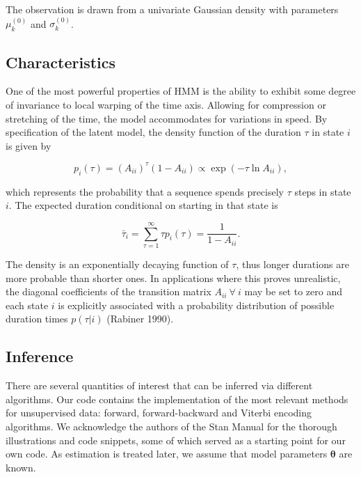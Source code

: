 \documentclass[]{article}
\newcommand{\mat}[1]{\mathbf{#1}}
\begin{document}
The observation is drawn from a univariate Gaussian density with
parameters \(\mu_k^{(0)}\) and \(\sigma_k^{(0)}\).

\subsection{Characteristics}\label{characteristics}

One of the most powerful properties of HMM is the ability to exhibit
some degree of invariance to local warping of the time axis. Allowing
for compression or stretching of the time, the model accommodates for
variations in speed. By specification of the latent model, the density
function of the duration \(\tau\) in state \(i\) is given by

\[
p_i(\tau) = (A_{ii})^{\tau} (1 - A_{ii}) \propto \exp (-\tau \ln A_{ii}),
\]

which represents the probability that a sequence spends precisely
\(\tau\) steps in state \(i\). The expected duration conditional on
starting in that state is

\[
\bar{\tau}_i = \sum_{\tau = 1}^{\infty}{\tau p_i(\tau)} = \frac{1}{1 - A_{ii}}.
\]

The density is an exponentially decaying function of \(\tau\), thus
longer durations are more probable than shorter ones. In applications
where this proves unrealistic, the diagonal coefficients of the
transition matrix \(A_{ii} \ \forall \ i\) may be set to zero and each
state \(i\) is explicitly associated with a probability distribution of
possible duration times \(p(\tau | i)\) (Rabiner 1990).

\subsection{Inference}\label{inference}

There are several quantities of interest that can be inferred via
different algorithms. Our code contains the implementation of the most
relevant methods for unsupervised data: forward, forward-backward and
Viterbi encoding algorithms. We acknowledge the authors of the Stan
Manual for the thorough illustrations and code snippets, some of which
served as a starting point for our own code. As estimation is treated
later, we assume that model parameters \(\mat{\theta}\) are known.

\scriptsize
\end{document}
